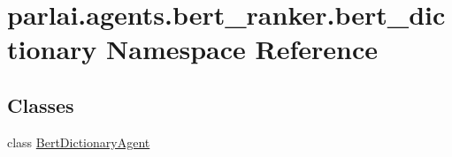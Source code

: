 \hypertarget{namespaceparlai_1_1agents_1_1bert__ranker_1_1bert__dictionary}{}\section{parlai.\+agents.\+bert\+\_\+ranker.\+bert\+\_\+dictionary Namespace Reference}
\label{namespaceparlai_1_1agents_1_1bert__ranker_1_1bert__dictionary}
\subsection*{Classes}
\begin{DoxyCompactItemize}
\item 
class \hyperlink{classparlai_1_1agents_1_1bert__ranker_1_1bert__dictionary_1_1BertDictionaryAgent}{Bert\+Dictionary\+Agent}
\end{DoxyCompactItemize}
